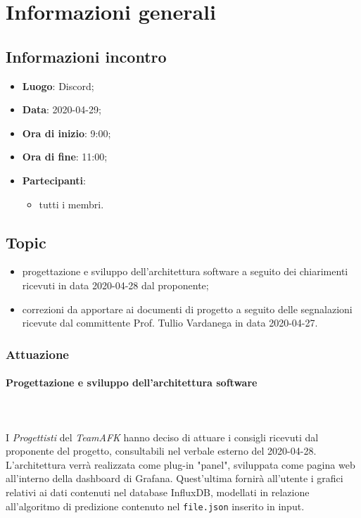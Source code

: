 \section{Informazioni generali}
\subsection{Informazioni incontro}
\begin{itemize}
\item \textbf{Luogo}: Discord;
\item \textbf{Data}: 2020-04-29;
\item \textbf{Ora di inizio}: 9:00;
\item \textbf{Ora di fine}: 11:00;
\item \textbf{Partecipanti}:
	\begin{itemize}
		\item tutti i membri.
	\end{itemize}
\end{itemize}

\subsection{Topic}
\begin{itemize}
\item progettazione e sviluppo dell'architettura software a seguito dei chiarimenti ricevuti in data 2020-04-28 dal proponente;
\item correzioni da apportare ai documenti di progetto a seguito delle segnalazioni ricevute dal committente Prof. Tullio Vardanega in data 2020-04-27.
\end{itemize}

\subsubsection{Attuazione}

\paragraph{Progettazione e sviluppo dell'architettura software} \mbox{} \\ \mbox{} \\
I \textit{Progettisti} del \textit{TeamAFK} hanno deciso di attuare i consigli ricevuti dal proponente del progetto, consultabili nel verbale esterno del 2020-04-28. \\
L'architettura verrà realizzata come plug-in "panel", sviluppata come pagina web all'interno della dashboard di Grafana. Quest'ultima fornirà all'utente i grafici relativi ai dati contenuti nel database InfluxDB, modellati in relazione all'algoritmo di predizione contenuto nel \texttt{file.json} inserito in input.

